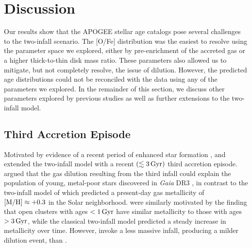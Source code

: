 \documentclass[twocolumn,twocolappendix,linenumbers]{aastex631}
\newcommand{\todo}[1]{{\color{red}#1}}
\newcommand{\yZ}[1]{$y/Z_\odot=#1$}
\newcommand{\Gyr}{\,{\rm Gyr}}
\begin{document}
\section{Discussion}
\label{sec:discussion}

Our results show that the APOGEE stellar age catalogs pose several challenges to the two-infall scenario. The [O/Fe] distribution was the easiest to resolve using the parameter space we explored, either by pre-enrichment of the accreted gas or a higher thick-to-thin disk mass ratio. These parameters also allowed us to mitigate, but not completely resolve, the issue of dilution. However, the predicted age distributions could not be reconciled with the data using any of the parameters we explored. In the remainder of this section, we discuss other parameters explored by previous studies as well as further extensions to the two-infall model.




\subsection{Third Accretion Episode}

Motivated by evidence of a recent period of enhanced star formation \citep[e.g.,][]{ruiz-lara_recurrent_2020}, \citet{spitoni_beyond_2023} and \citet{palla_mapping_2024} extended the two-infall model with a recent $(\lesssim3\Gyr)$ third accretion episode. \citet{spitoni_beyond_2023} argued that the gas dilution resulting from the third infall could explain the population of young, metal-poor stars discovered in {\it Gaia} DR3 \citep{recio-blanco_gaia_2023}, in contrast to the two-infall model of \citet{spitoni_apogee_2021} which predicted a present-day gas metallicity of ${\rm [M/H]}\approx+0.3$ in the Solar neighborhood. \citet{palla_mapping_2024} were similarly motivated by the finding that open clusters with ages $<1\Gyr$ have similar metallicity to those with ages $>3\Gyr$, while the classical two-infall model predicted a steady increase in metallicity over time. However, \citet{palla_mapping_2024} invoke a less massive infall, producing a milder dilution event, than \citet{spitoni_beyond_2023}.
\end{document}
